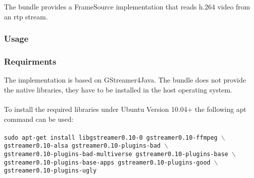 
The bundle provides a FrameSource implementation that reads h.264 video from an rtp stream.

\subsubsection{Usage}

\subsubsection{Requirments}

The implementation is based on GStreamer4Java. The bundle does not provide the native libraries, they have to be installed in the host operating system.
\\~\\
To install the required libraries under Ubuntu Version 10.04+ the following apt command can be used:
\\~\\
\texttt{sudo apt-get install libgstreamer0.10-0 gstreamer0.10-ffmpeg $\backslash$ \\
gstreamer0.10-alsa gstreamer0.10-plugins-bad $\backslash$ \\
gstreamer0.10-plugins-bad-multiverse gstreamer0.10-plugins-base $\backslash$ \\
gstreamer0.10-plugins-base-apps gstreamer0.10-plugins-good $\backslash$ \\
gstreamer0.10-plugins-ugly}
